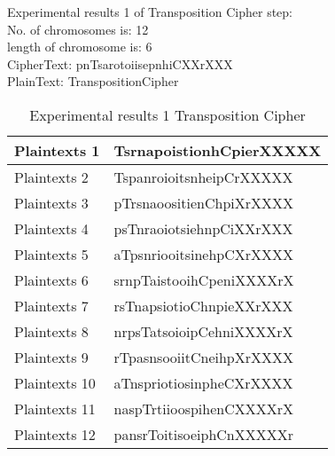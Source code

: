 \textsf{Experimental results 1 of Transposition Cipher step:}\\
    \colorbox{blue!30}{\textsf{     No. of chromosomes is: 12}}\\
    \colorbox{blue!30}{\textsf{     length of chromosome is: 6}}\\
    \colorbox{blue!30}{\textsf{     CipherText: pnTsarotoiisepnhiCXXrXXX}}\\
    \colorbox{blue!30}{\textsf{     PlainText: TranspositionCipher}}
\begin{table}[H]
\centering
\begin{tabular}{l l}\hline
    Plaintexts 1 &TsrnapoistionhCpierXXXXX\\ \hline
    Plaintexts 2&TspanroioitsnheipCrXXXXX\\ \hline
    Plaintexts 3&pTrsnaoositienChpiXrXXXX\\ \hline
    Plaintexts 4&psTnraoiotsiehnpCiXXrXXX\\ \hline
    Plaintexts 5&aTpsnriooitsinehpCXrXXXX\\ \hline
    Plaintexts 6 &srnpTaistooihCpeniXXXXrX\\ \hline
    Plaintexts 7 &rsTnapsiotioChnpieXXrXXX\\ \hline
    Plaintexts 8 &nrpsTatsoioipCehniXXXXrX\\ \hline
    Plaintexts 9 &rTpasnsooiitCneihpXrXXXX\\ \hline
    Plaintexts 10 &aTnspriotiosinpheCXrXXXX\\ \hline
    Plaintexts 11 &naspTrtiioospihenCXXXXrX\\ \hline
    Plaintexts 12 &pansrToitisoeiphCnXXXXXr\\ \hline
\end{tabular}
\caption{Experimental results 1 Transposition Cipher}

\end{table}


